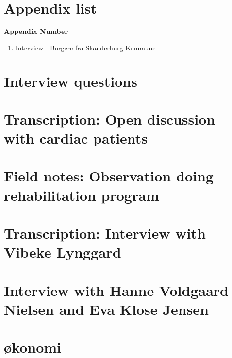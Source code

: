 \chapter{Appendix list}

\textbf{Appendix Number}
\begin{enumerate}
	\item Interview - Borgere fra Skanderborg
Kommune
\end{enumerate}



\chapter{Interview questions} \label{interviewquestion}

\chapter{Transcription: Open discussion with cardiac patients}

\chapter{Field notes: Observation doing rehabilitation program}

\chapter{Transcription: Interview with Vibeke Lynggard}

\chapter{Interview with Hanne Voldgaard Nielsen and Eva Klose Jensen}

\chapter{økonomi} \label{economics}

